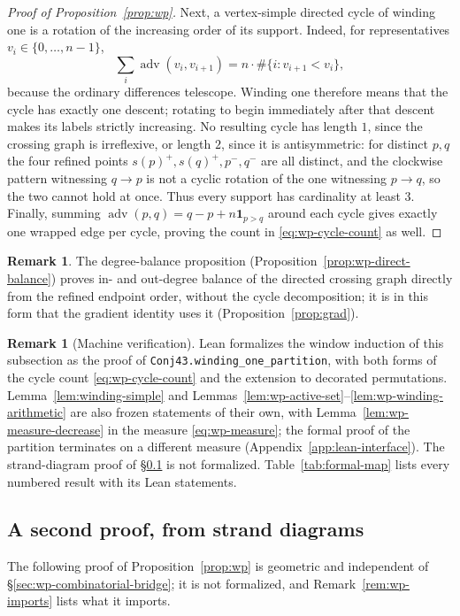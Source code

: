 \documentclass[11pt]{article}
\theoremstyle{definition}
\newtheorem{remark}[theorem]{Remark}
\begin{document}
\begin{proof}[Proof of Proposition~\ref{prop:wp}]
Next, a vertex-simple directed cycle of winding one is a rotation of the
increasing order of its support. Indeed, for representatives
\(v_i\in\{0,\ldots,n-1\}\),
\[
   \sum_i\operatorname{adv}(v_i,v_{i+1})
   =
   n\cdot
   \#\{i:v_{i+1}<v_i\},
\]
because the ordinary differences telescope. Winding one therefore means
that the cycle has exactly one descent; rotating to begin immediately after
that descent makes its labels strictly increasing. No resulting cycle has
length \(1\), since the crossing graph is irreflexive, or length \(2\), since
it is antisymmetric: for distinct \(p,q\) the four refined points
\(s(p)^+,s(q)^+,p^-,q^-\) are all distinct, and the clockwise pattern
witnessing \(q\to p\) is not a cyclic rotation of the one witnessing
\(p\to q\), so the two cannot hold at once. Thus every support has
cardinality at least \(3\).
Finally, summing $\operatorname{adv}(p,q)=q-p+n\mathbf1_{p>q}$ around each
cycle gives exactly one wrapped edge per cycle, proving the count in
\eqref{eq:wp-cycle-count} as well.
\end{proof}

\begin{remark}
The degree-balance proposition (Proposition~\ref{prop:wp-direct-balance})
proves in- and out-degree balance of the directed crossing graph directly
from the refined endpoint order, without the cycle decomposition; it is in
this form that the gradient identity uses it (Proposition~\ref{prop:grad}).
\end{remark}

\begin{remark}[Machine verification]\label{rem:machine}
Lean formalizes the window induction of this subsection as the proof of
\texttt{Conj43.\allowbreak winding\_\allowbreak one\_\allowbreak partition}, with both forms of the cycle count \eqref{eq:wp-cycle-count} and the
extension to decorated permutations. Lemma~\ref{lem:winding-simple} and
Lemmas~\ref{lem:wp-active-set}--\ref{lem:wp-winding-arithmetic} are also frozen statements of their own, with
Lemma~\ref{lem:wp-measure-decrease} in the measure \eqref{eq:wp-measure}; the formal proof of the partition
terminates on a different measure (Appendix~\ref{app:lean-interface}). The strand-diagram proof of
\S\ref{sec:wp-strand} is not formalized. Table~\ref{tab:formal-map} lists every numbered result with its Lean
statements.
\end{remark}

\subsection{A second proof, from strand diagrams}\label{sec:wp-strand}
The following proof of Proposition~\ref{prop:wp} is geometric and independent of
\S\ref{sec:wp-combinatorial-bridge}; it is not formalized, and Remark~\ref{rem:wp-imports} lists what it
imports.
\end{document}
